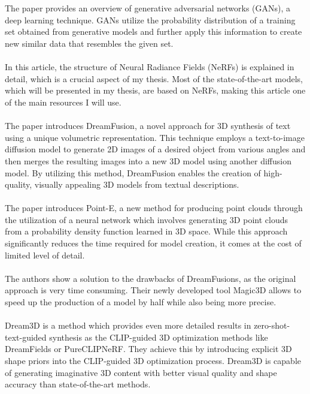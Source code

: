 \\
\textbf{\cite{goodfellow2020generative}}\\
The paper provides an overview of generative adversarial networks (GANs), a deep learning technique. GANs utilize the probability distribution of a training set obtained from generative models and further apply this information to create new similar data that resembles the given set.\\
\textbf{\cite{mildenhall2021nerf}}\\
In this article, the structure of Neural Radiance Fields (NeRFs) is explained in detail, which is a crucial aspect of my thesis. Most of the state-of-the-art models, which will be presented in my thesis, are based on NeRFs, making this article one of the main resources I will use.\\
\textbf{\cite{poole2022dreamfusion}}\\
The paper introduces DreamFusion, a novel approach for 3D synthesis of text using a unique volumetric representation. This technique employs a text-to-image diffusion model to generate 2D images of a desired object from various angles and then merges the resulting images into a new 3D model using another diffusion model. By utilizing this method, DreamFusion enables the creation of high-quality, visually appealing 3D models from textual descriptions.\\
\textbf{\cite{nichol2022point}}\\
The paper introduces Point-E, a new method for producing point clouds through the utilization of a neural network which involves generating 3D point clouds from a probability density function learned in 3D space. While this approach significantly reduces the time required for model creation, it comes at the cost of limited level of detail.\\
\textbf{\cite{lin2022magic3d}}\\
The authors show a solution to the drawbacks of DreamFusions, as the original approach is very time consuming. Their newly developed tool Magic3D allows to speed up the production of a model by half while also being more precise.\\
\textbf{\cite{xu2022dream3d}}\\
Dream3D is a method which provides even more detailed results in zero-shot-text-guided synthesis as the CLIP-guided 3D optimization methods like DreamFields or PureCLIPNeRF. They achieve this by introducing explicit 3D shape priors into the CLIP-guided 3D optimization process. Dream3D is capable of generating imaginative 3D content with better visual quality and shape accuracy than state-of-the-art methods.\\














